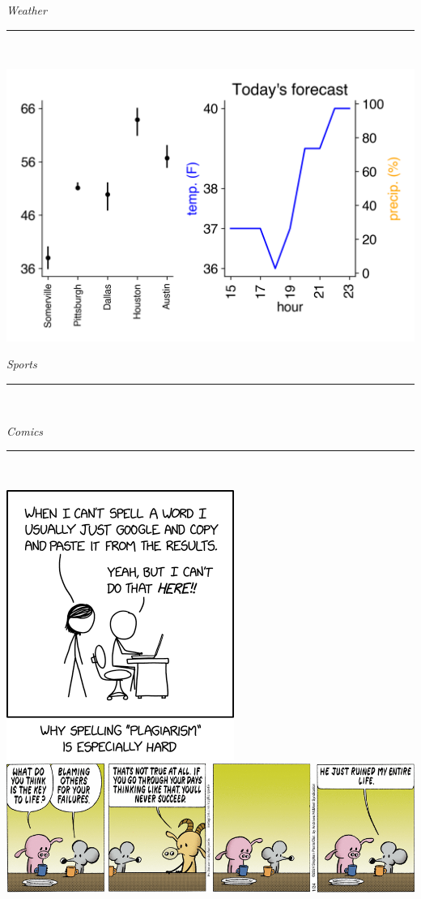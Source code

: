 \documentclass[landscape]{article}
\date{\today}
\renewcommand\headline[1]{\begin{center} {\huge \textsl{ #1}}\\ %
			\rule[5pt]{0.8\hsize}{0.5pt}\\ \end{center}}
\begin{document}
\maketitle

\begin{multicols}{3}
\headline{Weather}

\center\includegraphics[width=\linewidth]{images/weather.png}


\headline{Sports}

\begin{center}
	
\end{center}
\begin{center}
	
\end{center}

\headline{Comics}
\center\includegraphics[width=0.5\linewidth]{images/comic-xkcd.png}
\center\includegraphics[width=\linewidth]{images/comic-pearls.png}


\end{multicols}
\end{document}
